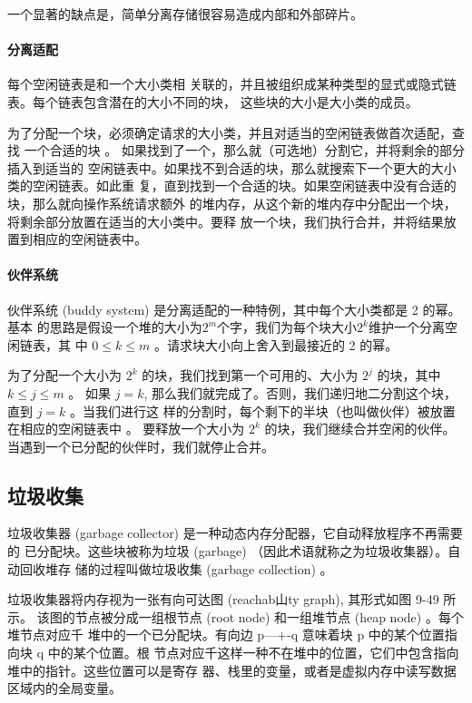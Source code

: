 一个显著的缺点是，简单分离存储很容易造成内部和外部碎片。

\paragraph{分离适配}

每个空闲链表是和一个大小类相
关联的，并且被组织成某种类型的显式或隐式链表。每个链表包含潜在的大小不同的块，
这些块的大小是大小类的成员。

为了分配一个块，必须确定请求的大小类，并且对适当的空闲链表做首次适配，查找
一个合适的块 。 如果找到了一个，那么就（可选地）分割它，并将剩余的部分插入到适当的
空闲链表中。如果找不到合适的块，那么就搜索下一个更大的大小类的空闲链表。如此重
复，直到找到一个合适的块。如果空闲链表中没有合适的块，那么就向操作系统请求额外
的堆内存，从这个新的堆内存中分配出一个块，将剩余部分放置在适当的大小类中。要释
放一个块，我们执行合并，并将结果放置到相应的空闲链表中。

\paragraph{伙伴系统}

伙伴系统 (buddy system) 是分离适配的一种特例，其中每个大小类都是 2 的幂。基本
的思路是假设一个堆的大小为$2^m$个字，我们为每个块大小$2^k$维护一个分离空闲链表，其
中 $0 \leq k \leq m$ 。请求块大小向上舍入到最接近的 2 的幂。

为了分配一个大小为 $2^k$ 的块，我们找到第一个可用的、大小为 $2^j$ 的块，其中 $k \leq j \leq m$ 。
如果 $j=k$, 那么我们就完成了。否则，我们递归地二分割这个块，直到 $j=k$ 。当我们进行这
样的分割时，每个剩下的半块（也叫做伙伴）被放置在相应的空闲链表中 。 要释放一个大小为
$2^k$ 的块，我们继续合并空闲的伙伴。当遇到一个已分配的伙伴时，我们就停止合并。

\subsection{垃圾收集}

垃圾收集器 (garbage collector) 是一种动态内存分配器，它自动释放程序不再需要的
已分配块。这些块被称为垃圾 (garbage) （因此术语就称之为垃圾收集器）。自动回收堆存
储的过程叫做垃圾收集 (garbage collection) 。

垃圾收集器将内存视为一张有向可达图 (reachab山ty graph), 其形式如图 9-49 所示。
该图的节点被分成一组根节点 (root node) 和一组堆节点 (heap node) 。每个堆节点对应千
堆中的一个已分配块。有向边 p---+-q 意味着块 p 中的某个位置指向块 q 中的某个位置。根
节点对应千这样一种不在堆中的位置，它们中包含指向堆中的指针。这些位置可以是寄存
器、栈里的变量，或者是虚拟内存中读写数据区域内的全局变量。

